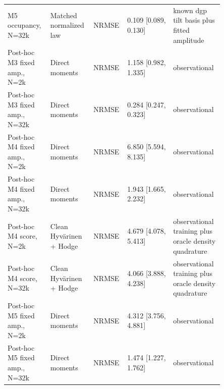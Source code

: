 \begin{longtable}{p{0.17\linewidth}p{0.18\linewidth}p{0.08\linewidth}p{0.20\linewidth}p{0.22\linewidth}}
M5 occupancy, N=32k & Matched normalized law & NRMSE & 0.109 [0.089, 0.130] & known dgp tilt basis plus fitted amplitude \\
Post-hoc M3 fixed amp., N=2k & Direct moments & NRMSE & 1.158 [0.982, 1.335] & observational \\
Post-hoc M3 fixed amp., N=32k & Direct moments & NRMSE & 0.284 [0.247, 0.323] & observational \\
Post-hoc M4 fixed amp., N=2k & Direct moments & NRMSE & 6.850 [5.594, 8.135] & observational \\
Post-hoc M4 fixed amp., N=32k & Direct moments & NRMSE & 1.943 [1.665, 2.232] & observational \\
Post-hoc M4 score, N=2k & Clean Hyv\"arinen + Hodge & NRMSE & 4.679 [4.078, 5.413] & observational training plus oracle density quadrature \\
Post-hoc M4 score, N=32k & Clean Hyv\"arinen + Hodge & NRMSE & 4.066 [3.888, 4.238] & observational training plus oracle density quadrature \\
Post-hoc M5 fixed amp., N=2k & Direct moments & NRMSE & 4.312 [3.756, 4.881] & observational \\
Post-hoc M5 fixed amp., N=32k & Direct moments & NRMSE & 1.474 [1.227, 1.762] & observational \\
\bottomrule\end{longtable}
